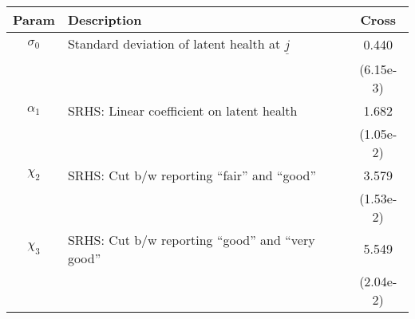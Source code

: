 \begin{table}[ht]\label{CrossMenSRHSparams}
\footnotesize
\begin{center}
\begin{tabular}{clc}
\hline \hline
Param & Description & Cross \\
\hline
$\sigma_{0}$ & Standard deviation of latent health at $\underline{j}$ & 0.440 \\
 & & (6.15e-3) \\
$\alpha_1$ & SRHS: Linear coefficient on latent health & 1.682 \\
 & & (1.05e-2) \\
$\chi_2$ & SRHS: Cut b/w reporting ``fair'' and ``good'' & 3.579 \\
 & & (1.53e-2) \\
$\chi_3$ & SRHS: Cut b/w reporting ``good'' and ``very good'' & 5.549 \\
 & & (2.04e-2) \\
\hline\hline
\end{tabular}
\end{center}
\end{table}
